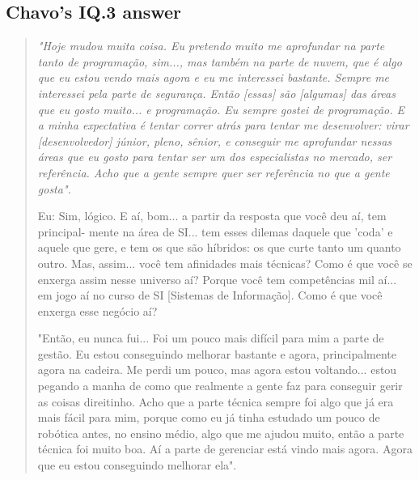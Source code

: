 \subsection{Chavo’s IQ.3 answer}
\label{interview-exc-ss:chavo-iq3}

\begin{quote}
    \itshape
    "Hoje mudou muita coisa. Eu pretendo muito me aprofundar na parte tanto de programação, sim..., mas também na parte de nuvem, que é algo que eu estou vendo mais agora e eu me interessei bastante. Sempre me interessei pela parte de segurança. Então [essas] são [algumas] das áreas que eu gosto muito... e programação. Eu sempre gostei de programação. E a minha expectativa é tentar correr atrás para tentar me desenvolver: virar [desenvolvedor] júnior, pleno, sênior, e conseguir me aprofundar nessas áreas que eu gosto para tentar ser um dos especialistas no mercado, ser referência. Acho que a gente sempre quer ser referência no que a gente gosta".

    \colorbox{black!15}{Eu: Sim, lógico. E aí, bom... a partir da resposta que você deu aí, tem principal-} \colorbox{black!15}{mente na área de SI... tem esses dilemas daquele que 'coda' e aquele que gere, e} \colorbox{black!15}{tem os que são híbridos: os que curte tanto um quanto outro. Mas, assim... você} \colorbox{black!15}{tem afinidades mais técnicas? Como é que você se enxerga assim nesse universo} \colorbox{black!15}{aí? Porque você tem competências mil aí... em jogo aí no curso de SI [Sistemas} \colorbox{black!15}{de Informação]. Como é que você enxerga esse negócio aí?}

    "Então, eu nunca fui... Foi um pouco mais difícil para mim a parte de gestão. Eu estou conseguindo melhorar bastante e agora, principalmente agora na cadeira. Me perdi um pouco, mas agora estou voltando... estou pegando a manha de como que realmente a gente faz para conseguir gerir as coisas direitinho. Acho que a parte técnica sempre foi algo que já era mais fácil para mim, porque como eu já tinha estudado um pouco de robótica antes, no ensino médio, algo que me ajudou muito, então a parte técnica foi muito boa. Aí a parte de gerenciar está vindo mais agora. Agora que eu estou conseguindo melhorar ela".      
\end{quote}



